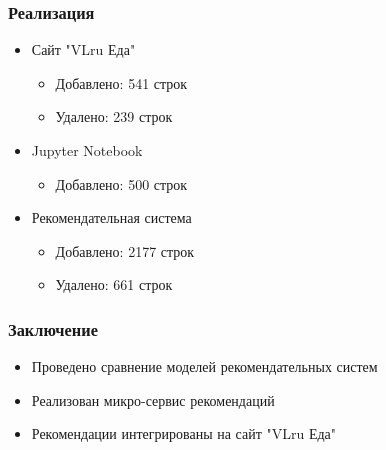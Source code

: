 \documentclass[10pt, unicode]{beamer}
\begin{document}
\begin{frame}
  \frametitle{Реализация}
  \begin{itemize}
    \item Сайт "VLru Еда"
      \begin{itemize}
        \item Добавлено: 541 строк
        \item Удалено: 239 строк
      \end{itemize}
    \item Jupyter Notebook
      \begin{itemize}
        \item Добавлено: 500 строк
      \end{itemize}
    \item Рекомендательная система
      \begin{itemize}
        \item Добавлено: 2177 строк
        \item Удалено: 661 строк
      \end{itemize}
  \end{itemize}
\end{frame}

\begin{frame}
  \frametitle{Заключение}
  \begin{itemize}
    \item Проведено сравнение моделей рекомендательных систем
    \item Реализован микро-сервис рекомендаций
    \item Рекомендации интегрированы на сайт "VLru Еда"
  \end{itemize}
\end{frame}
\end{document}

